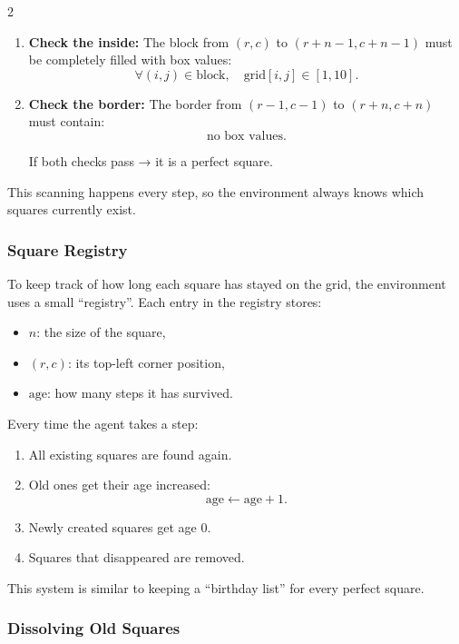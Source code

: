 \documentclass[a4paper]{article}
\begin{document}
\begin{multicols}{2}
\begin{enumerate}
    \item \textbf{Check the inside:}  
    The block from \((r,c)\) to \((r+n-1, c+n-1)\) must be completely filled with box values:
    \[
    \forall (i,j) \in \text{block},\quad \text{grid}[i,j] \in [1,10].
    \]

    \item \textbf{Check the border:}  
    The border from \((r-1, c-1)\) to \((r+n, c+n)\) must contain:
    \[
    \text{no box values}.
    \]

    If both checks pass → it is a perfect square.
\end{enumerate}

This scanning happens every step, so the environment always knows which squares currently exist.

\subsubsection{Square Registry}

To keep track of how long each square has stayed on the grid, the environment uses a small “registry”. Each entry in the registry stores:

\begin{itemize}
    \item \(n\): the size of the square,
    \item \((r,c)\): its top-left corner position,
    \item \(\text{age}\): how many steps it has survived.
\end{itemize}

Every time the agent takes a step:

\begin{enumerate}
    \item All existing squares are found again.
    \item Old ones get their age increased:
    \[
    \text{age} \leftarrow \text{age} + 1.
    \]
    \item Newly created squares get age \(0\).
    \item Squares that disappeared are removed.
\end{enumerate}

This system is similar to keeping a “birthday list” for every perfect square.

\subsubsection{Dissolving Old Squares}


\end{multicols}
\end{document}
